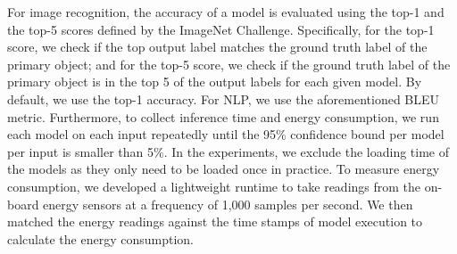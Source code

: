    For image recognition, the accuracy of a model is evaluated using the top-1 and the top-5 scores defined
by the ImageNet Challenge. Specifically, for the top-1 score, we check if the top output label matches the ground truth label of the
primary object; and for the top-5 score, we check if the ground truth label of the primary object is in the top 5 of the output labels for
each given model. By default, we use the top-1 accuracy. For NLP, we use the aforementioned BLEU metric. Furthermore, to collect inference
time and energy consumption, we run each model on each input repeatedly until the 95\% confidence bound per model per input is smaller than
5\%. In the experiments, we exclude the loading time of the \CNN models as they only need to be loaded once in practice. To measure energy
consumption, we developed a lightweight runtime to take readings from the on-board energy sensors at a frequency of 1,000 samples per
second. We then matched the energy readings against the time stamps of model execution to calculate the energy consumption.
